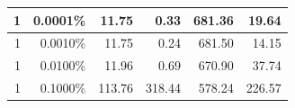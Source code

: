 \documentclass[12pt,a4paper]{report}
\begin{document}
\begin{table}[htbp]
\begin{tabular}{|r|r|r|r|r|r|}
1                                                                                               & 0.0001\%                                                                                             & 11.75                                                                                                 & 0.33                                                                                                                                & 681.36                                                                                                                                     & 19.64                                                                                                                             \\ \hline
1                                                                                               & 0.0010\%                                                                                             & 11.75                                                                                                 & 0.24                                                                                                                                & 681.50                                                                                                                                     & 14.15                                                                                                                             \\ \hline
1                                                                                               & 0.0100\%                                                                                             & 11.96                                                                                                 & 0.69                                                                                                                                & 670.90                                                                                                                                     & 37.74                                                                                                                             \\ \hline
1                                                                                               & 0.1000\%                                                                                             & 113.76                                                                                                & 318.44                                                                                                                              & 578.24                                                                                                                                     & 226.57                                                                                                                            \\ \hline

\end{tabular}
\end{table}
\end{document}
